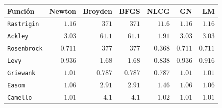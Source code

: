\begin{tabular}{l r r r r r r}
\toprule
\rowcolor{Azul1!50}
Función & Newton & Broyden & BFGS & NLCG & GN & LM \\
\midrule
\texttt{Rastrigin} & $1.16$ & $371$ & $371$ & $11.6$ & $1.16$ & $1.16$ \\
\texttt{Ackley} & $3.03$ & $61.1$ & $61.1$ & $1.91$ & $3.03$ & $3.03$ \\
\texttt{Rosenbrock} & $0.711$ & $377$ & $377$ & $0.368$ & $0.711$ & $0.711$ \\
\texttt{Levy} & $0.936$ & $1.68$ & $1.68$ & $0.838$ & $0.936$ & $0.916$ \\
\texttt{Griewank} & $1.01$ & $0.787$ & $0.787$ & $0.787$ & $1.01$ & $1.01$ \\
\texttt{Easom} & $1.06$ & $2.91$ & $2.91$ & $1.46$ & $1.06$ & $1.06$ \\
\texttt{Camello} & $1.01$ & $4.1$ & $4.1$ & $1.02$ & $1.01$ & $1.01$ \\
\bottomrule
\end{tabular}
